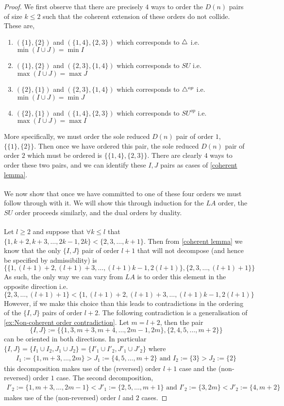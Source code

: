 \begin{proof}
We first observe that there are precisely $4$ ways to order the $D(n)$ pairs of size $k\leq 2$ such that the coherent extension of these orders do not collide.
These are,
\begin{enumerate}
    \item $(\{1\},\{2\})$ and $(\{1,4\},\{2,3\})$ which corresponds to $\triangle$ i.e. $\min(I\cup J) = \min I$
    \item $(\{1\},\{2\})$ and $(\{2,3\},\{1,4\})$ which corresponds to $SU$ i.e. $\max(I\cup J) = \max J$
    \item $(\{2\},\{1\})$ and $(\{2,3\},\{1,4\})$ which corresponds to $\triangle^{op}$ i.e. $\min(I\cup J) = \min J$
    \item $(\{2\},\{1\})$ and $(\{1,4\},\{2,3\})$ which corresponds to $SU^{op}$ i.e. $\max(I\cup J) = \max I$
\end{enumerate}
More specifically, we must order the sole reduced $D(n)$ pair of order $1$, $\{\{1\},\{2\}\}$.
Then once we have ordered this pair, the sole reduced $D(n)$ pair of order $2$ which must be ordered is $\{\{1,4\},\{2,3\} \}$.
There are clearly $4$ ways to order these two pairs, and we can identify these $I,J$ pairs as cases of \cref{coherent lemma}.
\\\\
We now show that once we have committed to one of these four orders we must follow through with it.
We will show this through induction for the $LA$ order, the $SU$ order proceeds similarly, and the dual orders by duality.
\\\\
Let $l\geq 2$ and suppose that $\forall k\leq l$ that $\{1,k+2,k+3,\dots,2k-1,2k\} < \{2,3,\dots,k+1\} $.
Then from \cref{coherent lemma} we know that the only $\{I,J\}$ pair of order $l+1$ that will not decompose (and hence be specified by admissibility) is 
$$\{\{1,(l+1)+2,(l+1)+3,\dots,(l+1)k-1,2(l+1)\}, \{2,3,\dots,(l+1)+1\}\}$$
As such, the only way we can vary from $LA$ is to order this element in the opposite direction i.e.
$$\{2,3,\dots,(l+1)+1\} < \{1,(l+1)+2,(l+1)+3,\dots,(l+1)k-1,2(l+1)\} $$
However, if we make this choice than this leads to contradictions in the ordering of the $\{I,J\}$ pairs of order $l+2$.
The following contradiction is a generalisation of \cref{ex:Non-coherent order contradiction}.
Let $m = l+2$, then the pair
$$\{I,J\}:= \{ \{1,3,m+3,m+4,\dots,2m-1,2m\}, \{2,4,5,\dots,m+2\} \}$$
can be oriented in both directions.
In particular $\{I,J\} = \{I_1 \cup I_2, J_1 \cup J_2\} = \{I'_1 \cup I'_2, J'_1 \cup J'_2\}$ where
\begin{align*}
    I_1:= \{1,m+3,\dots,2m\} > J_1:= \{4,5,\dots,m+2\} \text{ and } I_2:=\{3\} > J_2:= \{2\}
\end{align*}
this decomposition makes use of the (reversed) order $l+1$ case and the (non-reversed) order $1$ case.
The second decomposition,
\begin{align*}
    I'_2:= \{1,m+3,\dots,  2m-1\} < J'_1:= \{2,5,\dots,m+1\} \text{ and } I'_2:=\{3, 2m\} < J'_2:= \{4, m+2\}
\end{align*}
makes use of the (non-reversed) order $l$ and $2$ cases.
\end{proof}

